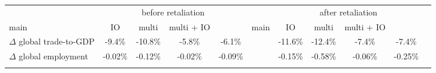\begin{tabular}{lcccccccccc}
\toprule
& \multicolumn{4}{c}{before retaliation} && \multicolumn{4}{c}{after retaliation} \\
\cmidrule(lr){2-5} \cmidrule(lr){7-10}
main & IO & multi & multi + IO  && main & IO & multi & multi + IO \\
\midrule
$\Delta$ global trade-to-GDP &
-9.4\% & 
-10.8\% &
-5.8\% & 
-6.1\% && 
-11.6\% & 
-12.4\% &
-7.4\% & 
-7.4\% \\ 
 \addlinespace[3pt]
$\Delta$ global employment &
-0.02\% & 
-0.12\% &
-0.02\% & 
-0.09\% && 
-0.15\% & 
-0.58\% &
-0.06\% & 
-0.25\% \\ 
 \addlinespace[3pt]
 \bottomrule
\end{tabular}
